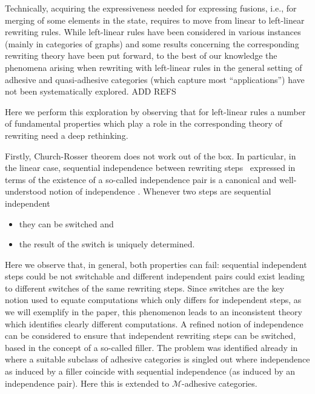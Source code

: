 \documentclass[a4paper,UKenglish,cleveref,pdftex, thm-restate,numberwithinsect]{lipics}
\begin{document}

Technically, acquiring the expressiveness needed for expressing
fusions, i.e., for merging of some elements in the state, requires to
move from linear to left-linear rewriting rules. While left-linear
rules have been considered in various instances (mainly in categories
of graphs) and some results concerning the corresponding rewriting
theory have been put forward, to the best of our knowledge the
phenomena arising when rewriting with left-linear rules in the general
setting of adhesive and quasi-adhesive categories (which capture most
``applications'') have not been systematically explored. ADD REFS

Here we perform this exploration by observing that for left-linear
rules a number of fundamental properties which play a role in the
corresponding theory of rewriting need a deep rethinking.

Firstly, Church-Rosser theorem does not work out of the box. In
particular, in the linear case, sequential independence between
rewriting steps~\cite{} expressed in terms of the existence of a
so-called independence pair is a canonical and well-understood notion
of independence .  Whenever two steps are sequential
independent
\begin{itemize}
\item they can be switched and 
\item the result of the switch is uniquely determined.
\end{itemize}

Here we observe that, in general, both properties can fail: sequential
independent steps could be not switchable and different independent
pairs could exist leading to different switches of the same rewriting
steps.  Since switches are the key notion used to equate computations
which only differs for independent steps, as we will exemplify in the
paper, this phenomenon leads to an inconsistent theory which
identifies clearly different computations.
A refined notion of
independence can be considered to ensure that independent rewriting
steps can be switched, based in the concept of a so-called filler. The
problem was identified already in~\cite{baldan2011adhesivity} where a
suitable subclass of adhesive categories is singled out where
independence as induced by a filler coincide with sequential
independence (as induced by an independence pair). Here this is
extended to $\mathcal{M}$-adhesive categories.
\end{document}
